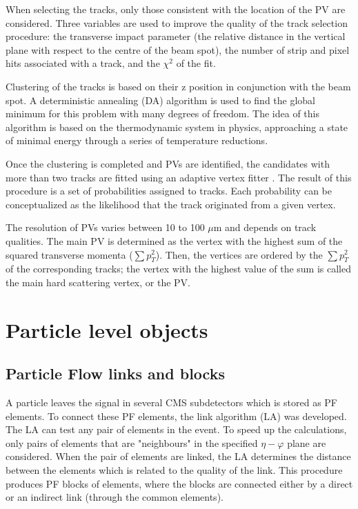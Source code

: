 When selecting the tracks, only those consistent with the location of the PV are considered. Three variables are used to improve the quality of the track selection procedure: the transverse impact parameter (the relative distance in the vertical plane with respect to the centre of the beam spot), the number of strip and pixel hits associated with a track, and the $\chi^2$ of the fit.

Clustering of the tracks is based on their z position in conjunction with the beam spot. A deterministic annealing (DA) algorithm \cite{DeterministicAnnealing} is used to find the global minimum for this problem with many degrees of freedom. The idea of this algorithm is based on the thermodynamic system in physics, approaching a state of minimal energy through a series of temperature reductions. 

Once the clustering is completed and PVs are identified, the candidates with more than two tracks are fitted using an adaptive vertex fitter \cite{AdaptiveVertexFitting}. The result of this procedure is a set of probabilities assigned to tracks. Each probability can be conceptualized as the likelihood that the track originated from a given vertex.

The resolution of PVs varies between 10 to 100 $\mu$m and depends on track qualities. The main PV is determined as the vertex with the highest sum of the squared transverse momenta ($\sum p_T^2$). Then, the vertices are ordered by the $\sum p_T^2$ of the corresponding tracks; the vertex with the highest value of the sum is called the main hard scattering vertex, or the PV. 

\section{Particle level objects}\label{sec:muons}
\subsection{Particle Flow links and blocks}\label{sec:some_reconstruction}

A particle leaves the signal in several CMS subdetectors which is stored as PF \cite{ParticleFlow} elements. To connect these PF elements, the link algorithm (LA) was developed. The LA can test any pair of elements in the event. To speed up the calculations, only pairs of elements that are "neighbours" in the specified $\eta - \varphi$ plane are considered. When the pair of elements are linked, the LA determines the distance between the elements which is related to the quality of the link. This procedure produces PF blocks of elements, where the blocks are connected either by a direct or an indirect link (through the common elements).

